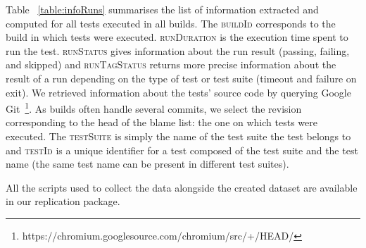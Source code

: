 Table ~\ref{table:infoRuns} summarises the list of information extracted and computed for all tests executed in all builds. The \textsc{buildId} corresponds to the build in which tests were executed. \textsc{runDuration} is the execution time spent to run the test. \textsc{runStatus} gives information about the run result (\eg passing, failing, and skipped) and \textsc{runTagStatus} returns more precise information about the result of a run depending on the type of test or test suite (\eg timeout and failure on exit). We retrieved information about the tests' source code by querying Google Git~\footnote{https://chromium.googlesource.com/chromium/src/+/HEAD/}. As builds often handle several commits, we select the revision corresponding to the head of the blame list: the one on which tests were executed. The \textsc{testSuite} is simply the name of the test suite the test belongs to and \textsc{testId} is a unique identifier for a test composed of the test suite and the test name (the same test name can be present in different test suites).

All the scripts used to collect the data alongside the created dataset are available in our replication package.


